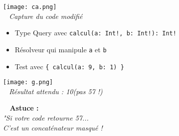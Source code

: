 \documentclass{article}
\begin{document}
\begin{center}
\texttt{[image: ca.png]} \\
\footnotesize{\textit{\faCamera~ Capture du code modifié}}
\end{center}

\begin{tcolorbox}[ colback=blue!5!white,
    colframe=blue!75!black,]

\begin{itemize}
    \item[\faCheckCircle] Type Query avec \texttt{calcul(a: Int!, b: Int!): Int!}
    \item[\faCheckCircle] Résolveur qui manipule \texttt{a} et \texttt{b}
    \item[\faCheckCircle] Test avec \texttt{\{ calcul(a: 9, b: 1) \}}
\end{itemize}
\end{tcolorbox}

\begin{center}
\texttt{[image: g.png]} \\
\footnotesize{\textit{\faThumbsUp~ Résultat attendu : 10(pas 57 !) \faSmileO}}
\end{center}

\textbf{\faCommentingO~ Astuce :} \\
\emph{"Si votre code retourne 57...} \\
\emph{C'est un concaténateur masqué ! \faSearch\ \faGrin}
\end{document}
